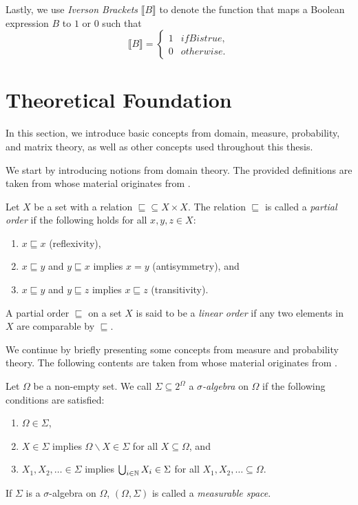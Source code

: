 Lastly, we use \textit{Iverson Brackets} $\llbracket B \rrbracket$ to denote the function that maps a Boolean expression $B$ to $1$ or $0$ such that
\[\llbracket B\rrbracket = \begin{cases*}
    1 & if B is true,\\
    0 & otherwise.
\end{cases*}\]

\section{Theoretical Foundation}\label{sec:matheteil}
In this section, we introduce basic concepts from domain, measure, probability, and matrix theory, as well as other concepts used throughout this thesis.

We start by introducing notions from domain theory.
The provided definitions are taken from \cite{Computing_EVTs_Stationary_Distr_in_MCs_Mertens} whose material originates from \cite[Chapters 1]{Abramsky_Gabbay_Maibaum_Book_Matheteil}.

\begin{definition}
    Let $X$ be a set with a relation $\sqsubseteq \subseteq X \times X$. The relation $\sqsubseteq$ is called a \textit{partial order} if the following holds for all $x,y,z \in X$:
    \begin{enumerate}[label=(\roman*)]
        \item $x \sqsubseteq x$ (reflexivity),
        \item $x \sqsubseteq y$ and $y \sqsubseteq x$ implies $x = y$ (antisymmetry), and
        \item $x \sqsubseteq y$ and $y \sqsubseteq z$ implies $x \sqsubseteq z$ (transitivity).
    \end{enumerate}
\end{definition}
A partial order $\sqsubseteq$ on a set $X$ is said to be a \textit{linear order} if any two elements in $X$ are comparable by $\sqsubseteq$.

We continue by briefly presenting some concepts from measure and probability theory.
The following contents are taken from \cite{Computing_EVTs_Stationary_Distr_in_MCs_Mertens} whose material originates from \cite[Chapters 1, 4, and 5]{Ash_Book_Matheteil}.
\begin{definition}
    Let $\Omega$ be a non-empty set. We call $\Sigma \subseteq 2^{\Omega}$ a \textit{$\sigma$-algebra} on $\Omega$ if the following conditions are satisfied:
    \begin{enumerate}[label=(\roman*)]
        \item $\Omega \in \Sigma$,
        \item $X \in \Sigma$ implies $\Omega\backslash X \in \Sigma$ for all $X \subseteq \Omega$, and
        \item $X_1,X_2,\dots \in \Sigma$ implies $\bigcup_{i\in \mathbb{N}}X_i\in \Sigma$ for all $X_1,X_2,\dots \subseteq \Omega$.
    \end{enumerate}
    If $\Sigma$ is a $\sigma$-algebra on $\Omega$, $(\Omega,\Sigma)$ is called a \textit{measurable space}.
\end{definition}

